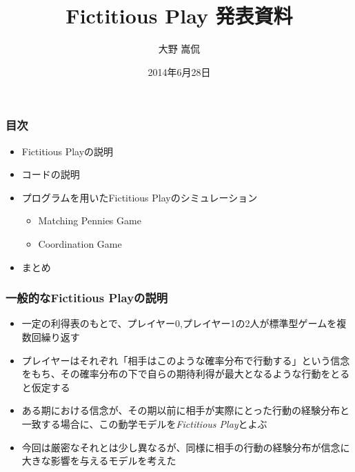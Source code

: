 \documentclass[dvipdfmx,fleqn,handout]{beamer}
\title{\Large Fictitious Play 発表資料}
\author{\large 大野 嵩侃}
\date{\small 2014年6月28日}
\begin{document}
\sffamily
\gtfamily


\begin{frame}
  \titlepage
  \thispagestyle{empty}
\end{frame}

\setcounter{framenumber}{0}




\begin{frame}
\frametitle{目次}
\begin{itemize}\setlength{\parskip}{0.5em}
\item
Fictitious Playの説明
\item
コードの説明
\item
プログラムを用いたFictitious Playのシミュレーション 
\begin{itemize}\setlength{\parskip}{0.5em}
 \item
 Matching Pennies Game
 \item
 Coordination Game
 \end{itemize}
\item
まとめ
\end{itemize}
\end{frame}



\begin{frame}
\frametitle{一般的なFictitious Playの説明}
\begin{itemize}\setlength{\parskip}{0.5em}
\item
一定の利得表のもとで、プレイヤー0,プレイヤー1の2人が標準型ゲームを複数回繰り返す\pause
\item
プレイヤーはそれぞれ「相手はこのような確率分布で行動する」という信念をもち、その確率分布の下で自らの期待利得が最大となるような行動をとると仮定する\pause
\item
ある期における信念が、その期以前に相手が実際にとった行動の経験分布と一致する場合に、この動学モデルを\emph{Fictitious Play}とよぶ\pause
\item
今回は厳密なそれとは少し異なるが、同様に相手の行動の経験分布が信念に大きな影響を与えるモデルを考えた
\end{itemize}
\end{frame}
\end{document}
